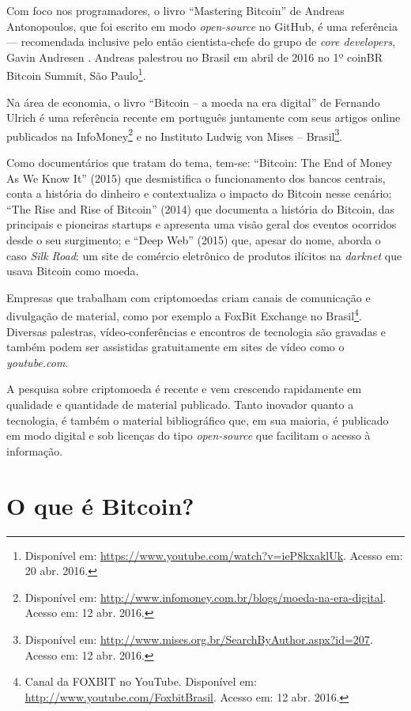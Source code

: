 Com foco nos programadores, o livro ``Mastering Bitcoin'' de Andreas Antonopoulos, que foi escrito em modo \textit{open-source} no GitHub, é uma referência --- recomendada inclusive pelo então cientista-chefe do grupo de \textit{core developers}, Gavin Andresen \cite{bib:bitcoinbook}. Andreas palestrou no Brasil em abril de 2016 no 1º coinBR Bitcoin Summit, São Paulo\footnote{Disponível em: \url{https://www.youtube.com/watch?v=ieP8kxaklUk}. Acesso em: 20 abr. 2016.}.

Na área de economia, o livro ``Bitcoin -- a moeda na era digital'' de Fernando Ulrich é uma referência recente em português \cite{bib:fernando-ulrich} juntamente com seus artigos online publicados na InfoMoney\footnote{Disponível em: \url{http://www.infomoney.com.br/blogs/moeda-na-era-digital}. Acesso em: 12 abr. 2016.} e no Instituto Ludwig von Mises -- Brasil\footnote{Disponível em: \url{http://www.mises.org.br/SearchByAuthor.aspx?id=207}. Acesso em: 12 abr. 2016.}.

Como documentários que tratam do tema, tem-se: ``Bitcoin: The End of Money As We Know It'' (2015) que desmistifica o funcionamento dos bancos centrais, conta a história do dinheiro e contextualiza o impacto do Bitcoin nesse cenário; ``The Rise and Rise of Bitcoin'' (2014) que documenta a história do Bitcoin, das principais e pioneiras startups e apresenta uma visão geral dos eventos ocorridos desde o seu surgimento; e ``Deep Web'' (2015) que, apesar do nome, aborda o caso \textit{Silk Road}: um site de comércio eletrônico de produtos ilícitos na \textit{darknet} que usava Bitcoin como moeda.

Empresas que trabalham com criptomoedas criam canais de comunicação e divulgação de material, como por exemplo a FoxBit Exchange no Brasil\footnote{Canal da FOXBIT no YouTube. Disponível em: \url{http://www.youtube.com/FoxbitBrasil}. Acesso em: 12 abr. 2016.}. Diversas palestras, vídeo-conferências e encontros de tecnologia são gravadas e também podem ser assistidas gratuitamente em sites de vídeo como o \textit{youtube.com}.

A pesquisa sobre criptomoeda é recente e vem crescendo rapidamente em qualidade e quantidade de material publicado. Tanto inovador quanto a tecnologia, é também o material bibliográfico que, em sua maioria, é publicado em modo digital e sob licenças do tipo \textit{open-source} que facilitam o acesso à informação.

\section{O que é Bitcoin?}

